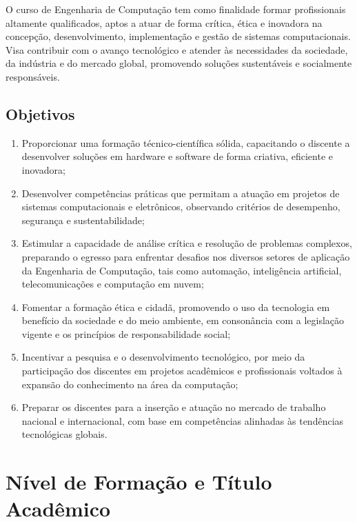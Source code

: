 O curso de Engenharia de Computação tem como finalidade formar profissionais altamente qualificados, aptos a atuar de forma crítica, ética e inovadora na concepção, desenvolvimento, implementação e gestão de sistemas computacionais. Visa contribuir com o avanço tecnológico e atender às necessidades da sociedade, da indústria e do mercado global, promovendo soluções sustentáveis e socialmente responsáveis.

\subsection{Objetivos}

\begin{enumerate}
    \item Proporcionar uma formação técnico-científica sólida, capacitando o discente a desenvolver soluções em hardware e software de forma criativa, eficiente e inovadora;

    \item Desenvolver competências práticas que permitam a atuação em projetos de sistemas computacionais e eletrônicos, observando critérios de desempenho, segurança e sustentabilidade;

    \item Estimular a capacidade de análise crítica e resolução de problemas complexos, preparando o egresso para enfrentar desafios nos diversos setores de aplicação da Engenharia de Computação, tais como automação, inteligência artificial, telecomunicações e computação em nuvem;

    \item Fomentar a formação ética e cidadã, promovendo o uso da tecnologia em benefício da sociedade e do meio ambiente, em consonância com a legislação vigente e os princípios de responsabilidade social;

    \item Incentivar a pesquisa e o desenvolvimento tecnológico, por meio da participação dos discentes em projetos acadêmicos e profissionais voltados à expansão do conhecimento na área da computação;

    \item Preparar os discentes para a inserção e atuação no mercado de trabalho nacional e internacional, com base em competências alinhadas às tendências tecnológicas globais.
\end{enumerate}

\section{Nível de Formação e Título Acadêmico}

